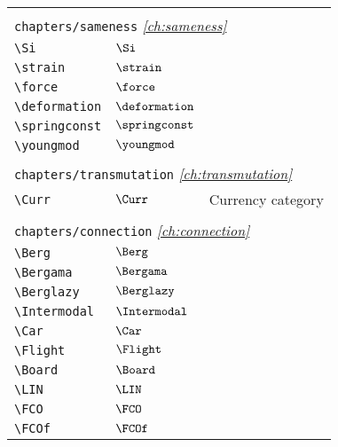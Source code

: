 \begin{longtable}{lll}
 \hline
 &  & \\ 
 \multicolumn{3}{l}{{\color[rgb]{0.5,0.5,0.5}\texttt{chapters/sameness}} \emph{\cref{ch:sameness}}}\\ 
 \hline
{\color[rgb]{0.5,0.5,0.5}\texttt{\textbackslash Si}} & $\Si$ & \\ 
 {\color[rgb]{0.5,0.5,0.5}\texttt{\textbackslash strain}} & $\strain$ & \\ 
 {\color[rgb]{0.5,0.5,0.5}\texttt{\textbackslash force}} & $\force$ & \\ 
 {\color[rgb]{0.5,0.5,0.5}\texttt{\textbackslash deformation}} & $\deformation$ & \\ 
 {\color[rgb]{0.5,0.5,0.5}\texttt{\textbackslash springconst}} & $\springconst$ & \\ 
 {\color[rgb]{0.5,0.5,0.5}\texttt{\textbackslash youngmod}} & $\youngmod$ & \\ 
  &  & \\ 
 \multicolumn{3}{l}{{\color[rgb]{0.5,0.5,0.5}\texttt{chapters/transmutation}} \emph{\cref{ch:transmutation}}}\\ 
 \hline
{\color[rgb]{0.5,0.5,0.5}\texttt{\textbackslash Curr}} & $\Curr$ &  Currency category\\ 
  &  & \\ 
 \multicolumn{3}{l}{{\color[rgb]{0.5,0.5,0.5}\texttt{chapters/connection}} \emph{\cref{ch:connection}}}\\ 
 \hline
{\color[rgb]{0.5,0.5,0.5}\texttt{\textbackslash Berg}} & $\Berg$ & \\ 
 {\color[rgb]{0.5,0.5,0.5}\texttt{\textbackslash Bergama}} & $\Bergama$ & \\ 
 {\color[rgb]{0.5,0.5,0.5}\texttt{\textbackslash Berglazy}} & $\Berglazy$ & \\ 
 {\color[rgb]{0.5,0.5,0.5}\texttt{\textbackslash Intermodal}} & $\Intermodal$ & \\ 
 {\color[rgb]{0.5,0.5,0.5}\texttt{\textbackslash Car}} & $\Car$ & \\ 
 {\color[rgb]{0.5,0.5,0.5}\texttt{\textbackslash Flight}} & $\Flight$ & \\ 
 {\color[rgb]{0.5,0.5,0.5}\texttt{\textbackslash Board}} & $\Board$ & \\ 
 {\color[rgb]{0.5,0.5,0.5}\texttt{\textbackslash LIN}} & $\LIN$ & \\ 
 {\color[rgb]{0.5,0.5,0.5}\texttt{\textbackslash FCO}} & $\FCO$ & \\ 
 {\color[rgb]{0.5,0.5,0.5}\texttt{\textbackslash FCOf}} & $\FCOf$ & \\ 

\end{longtable}
